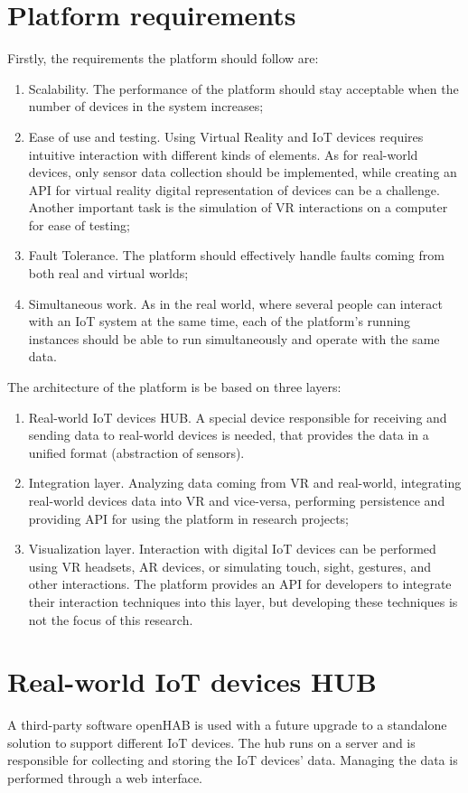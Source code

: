 \section{Platform requirements}
Firstly, the requirements the platform should follow are:
\begin{enumerate}
\item Scalability. The performance of the platform should stay acceptable when the number of devices in the system increases;
\item Ease of use and testing. Using Virtual Reality and IoT devices requires intuitive interaction with different kinds of elements. As for real-world devices, only sensor data collection should be implemented, while creating an API for virtual reality digital representation of devices can be a challenge. Another important task is the simulation of VR interactions on a computer for ease of testing;
\item Fault Tolerance. The platform should effectively handle faults coming from both real and virtual worlds;
\item Simultaneous work. As in the real world, where several people can interact with an IoT system at the same time, each of the platform's running instances should be able to run simultaneously and operate with the same data.
\end{enumerate}
The architecture of the platform is be based on three layers: 
\begin{enumerate}
    \item Real-world IoT devices HUB. A special device responsible for receiving and sending data to real-world devices is needed, that provides the data in a unified format (abstraction of sensors).
    \item Integration layer. Analyzing data coming from VR and real-world, integrating real-world devices data into VR and vice-versa, performing persistence and providing API for using the platform in research projects;
    \item Visualization layer. Interaction with digital IoT devices can be performed using VR headsets, AR devices, or simulating touch, sight, gestures, and other interactions. The platform provides an API for developers to integrate their interaction techniques into this layer, but developing these techniques is not the focus of this research. 
\end{enumerate}

\section{Real-world IoT devices HUB}
A third-party software openHAB is used with a future upgrade to a standalone solution to support different IoT devices. The hub runs on a server and is responsible for collecting and storing the IoT devices' data. Managing the data is performed through a web interface.

